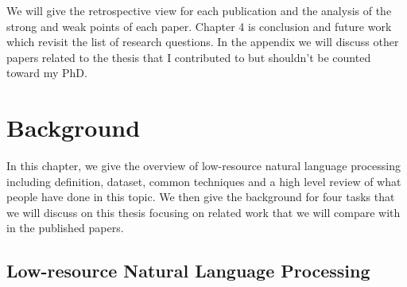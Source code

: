 \documentclass[12pt,twoside,final,hidelinks]{ltthesis}
\theoremstyle{definition}
\begin{document}
We will give the retrospective view for each publication and the analysis of the strong and weak points of each paper. Chapter 4 is conclusion and future work which revisit the list of research questions. In the appendix we will discuss other papers related to the thesis that I contributed to but shouldn't be counted toward my PhD. 
%

\chapter{Background}
In this chapter, we give the overview of low-resource natural language processing including definition, dataset, common techniques and a high level review of what people have done in this topic. We then give the background for four tasks that we will discuss on this thesis focusing on related work that we will compare with in the published papers. 

\section{Low-resource Natural Language Processing}
\end{document}
